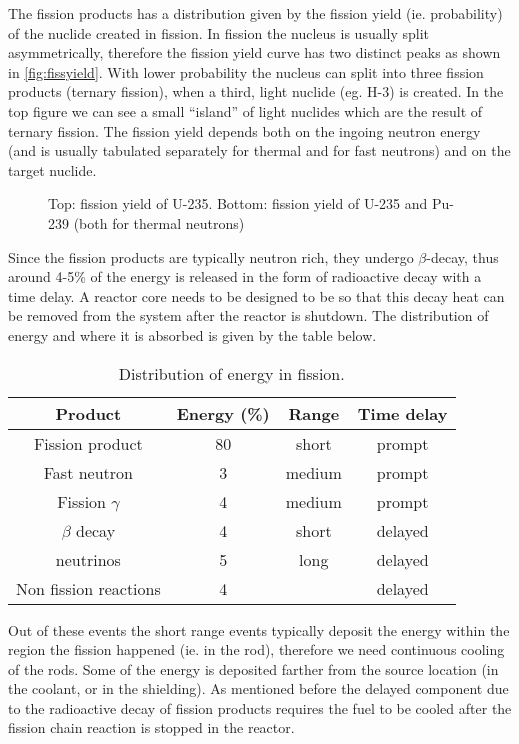 The fission products has a distribution given by the fission yield (ie. probability) of the nuclide created in fission. In fission the nucleus is usually split asymmetrically, therefore the fission yield curve has two distinct peaks as shown in \autoref{fig:fissyield}. With lower probability the nucleus can split into three fission products (ternary fission), when a third, light nuclide (eg. H-3) is created. In the top figure we can see a small ``island'' of light nuclides which are the result of ternary fission. The fission yield depends both on the ingoing neutron energy (and is usually tabulated separately for thermal and for fast neutrons) and on the target nuclide.

\begin{figure}[ht!]
\protect {}\protect
\caption{\label{fig:fissyield} \footnotesize{Top: fission yield of U-235. Bottom: fission yield of U-235 and Pu-239 (both for thermal neutrons)}}
\end{figure}

Since the fission products are typically neutron rich, they undergo $\beta$-decay, thus around 4-5\% of the energy is released in the form of radioactive decay with a time delay. A reactor core needs to be designed to be so that this decay heat can be removed from the system after the reactor is shutdown. The distribution of energy and where it is absorbed is given by the table below.

\begin{table}\caption{Distribution of energy in fission.}
\begin{tabular}{c | c | c | c}
Product & Energy (\%) & Range & Time delay \\
\hline
Fission product & 80 & short & prompt \\
Fast neutron & 3 & medium & prompt \\
Fission $\gamma$ & 4 & medium & prompt \\
$\beta$ decay & 4 & short & delayed \\
neutrinos & 5 & long & delayed \\
Non fission reactions & 4 &  & delayed 
\end{tabular}
\end{table}

Out of these events the short range events typically deposit the energy within the region the fission happened (ie. in the rod), therefore we need continuous cooling of the rods. Some of the energy is deposited farther from the source location (in the coolant, or in the shielding). As mentioned before the delayed component due to the radioactive decay of fission products requires the fuel to be cooled after the fission chain reaction is stopped in the reactor.

